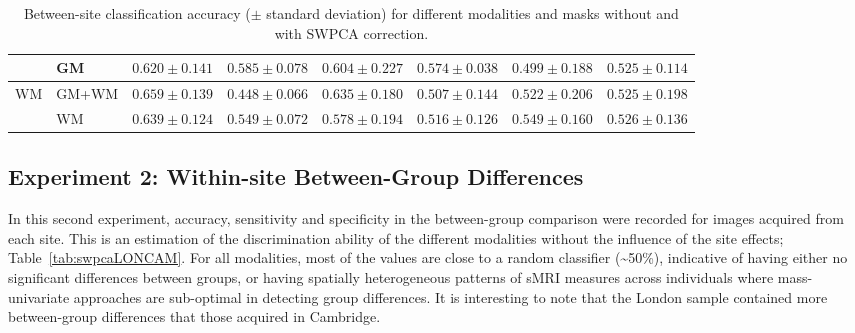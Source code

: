 \begin{table}
\begin{tabularx}{\textwidth}{XX|XX|XX|XX}
		&	GM &	$ 0.620 \pm 0.141 $ & $ 0.585 \pm 0.078 $ & $ 0.604 \pm 0.227 $ & $ 0.574 \pm 0.038 $  &	$ 0.499 \pm 0.188 $ &  $ 0.525 \pm 0.114 $ \\
		\midrule
		\multirow{2}{*}{\ac{WM}} &GM+WM &	$ 0.659 \pm 0.139 $ & $ 0.448 \pm 0.066 $ & $ 0.635 \pm 0.180 $ & $ 0.507 \pm 0.144 $  &	$ 0.522 \pm 0.206 $  & $ 0.525 \pm 0.198 $ \\
		&	WM & $ 0.639 \pm 0.124 $ & $ 0.549 \pm 0.072 $ & $ 0.578 \pm 0.194 $ & $ 0.516 \pm 0.126 $  & 	$ 0.549 \pm 0.160 $ &  $ 0.526 \pm 0.136 $ \\
		\bottomrule
	\end{tabularx}
	\caption[Between-site classification accuracy ($\pm$ standard deviation) for
	different modalities and masks without and with \acs{SWPCA} correction.]{Between-site classification accuracy ($\pm$ standard deviation) for different modalities and masks without and with \ac{SWPCA} correction.}
	\label{tab:swpcaAqSite}
\end{table}


\subsection{Experiment 2: Within-site Between-Group Differences}\label{sec:swpcaE2}
In this second experiment, accuracy, sensitivity and specificity in the
between-group comparison were recorded for images acquired from each
site. This is an estimation of the discrimination ability of the
different modalities without the influence of the site effects;
Table~\ref{tab:swpcaLONCAM}. For all modalities, most of the values are close to a random
classifier (\~{}50\%), indicative of having either no significant
differences between groups, or having spatially heterogeneous patterns
of s\ac{MRI} measures across individuals where mass-univariate approaches
are sub-optimal in detecting group differences. It is interesting to
note that the London sample contained more between-group differences
that those acquired in Cambridge. 

